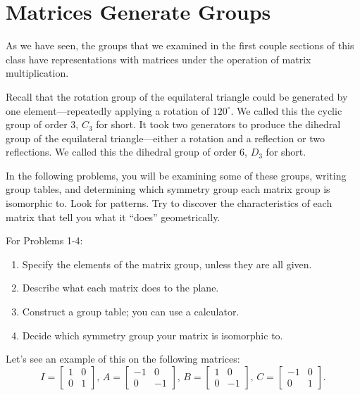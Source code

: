 \documentclass[../gatm.tex]{subfiles}
\begin{document}
\section{Matrices Generate Groups}
\setcounter{problem_i}{0}

As we have seen, the groups that we examined in the first couple sections of this class have representations with matrices under the operation of matrix multiplication.

Recall that the rotation group of the equilateral triangle could be generated by one element---repeatedly applying a rotation of $120^\circ$. We called this the cyclic group of order $3$, $C_3$ for short. It took two generators to produce the dihedral group of the equilateral triangle---either a rotation and a reflection or two reflections. We called this the dihedral group of order $6$, $D_3$ for short.

In the following problems, you will be examining some of these groups, writing group tables, and determining which symmetry group each matrix group is isomorphic to. Look for patterns. Try to discover the characteristics of each matrix that tell you what it ``does'' geometrically.

For Problems 1-4:
\begin{enumerate}[label=(\alph*)]
\item Specify the elements of the matrix group, unless they are all given.
\item Describe what each matrix does to the plane.
\item Construct a group table; you can use a calculator.
\item Decide which symmetry group your matrix is isomorphic to.
\end{enumerate}
\vspace{1cm}

Let's see an example of this on the following matrices:
$$I=\left[\begin{array}{cc} 1 & 0 \\ 0 & 1 \end{array}\right],\, A=\left[\begin{array}{cc} -1 & 0 \\ 0 & -1 \end{array}\right],\,  B=\left[\begin{array}{cc} 1 & 0 \\ 0 & -1 \end{array}\right],\, C=\left[\begin{array}{cc} -1 & 0 \\ 0 & 1 \end{array}\right].$$
\end{document}
